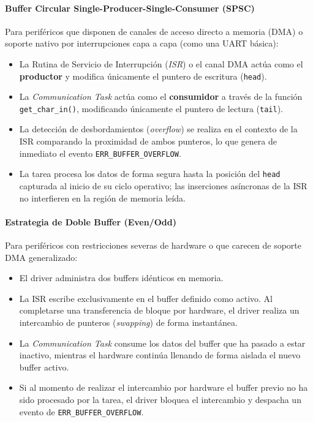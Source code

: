 \paragraph{Buffer Circular Single-Producer-Single-Consumer (SPSC)}

Para periféricos que disponen de canales de acceso directo a memoria (DMA) o soporte nativo por interrupciones capa a capa (como una UART básica):

\begin{itemize}
    \item La Rutina de Servicio de Interrupción (\textit{ISR}) o el canal DMA actúa como el \textbf{productor} y modifica únicamente el puntero de escritura (\texttt{head}).
    \item La \textit{Communication Task} actúa como el \textbf{consumidor} a través de la función \texttt{get\_char\-\_in()}, modificando únicamente el puntero de lectura (\texttt{tail}).
    \item La detección de desbordamientos (\textit{overflow}) se realiza en el contexto de la ISR comparando la proximidad de ambos punteros, lo que genera de inmediato el evento \texttt{ERR\_BUFFER\_OVERFLOW}.
    \item La tarea procesa los datos de forma segura hasta la posición del \texttt{head} capturada al inicio de su ciclo operativo; las inserciones asíncronas de la ISR no interfieren en la región de memoria leída.
\end{itemize}

\paragraph{Estrategia de Doble Buffer (Even/Odd)}

Para periféricos con restricciones severas de hardware o que carecen de soporte DMA generalizado:
\begin{itemize}
    \item El driver administra dos buffers idénticos en memoria.
    \item La ISR escribe exclusivamente en el buffer definido como activo. Al completarse una transferencia de bloque por hardware, el driver realiza un intercambio de punteros (\textit{swapping}) de forma instantánea.
    \item La \textit{Communication Task} consume los datos del buffer que ha pasado a estar inactivo, mientras el hardware continúa llenando de forma aislada el nuevo buffer activo.
    \item Si al momento de realizar el intercambio por hardware el buffer previo no ha sido procesado por la tarea, el driver bloquea el intercambio y despacha un evento de \texttt{ERR\_BUFFER\_OVERFLOW}.
\end{itemize}

